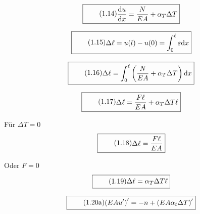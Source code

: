 \documentclass[11pt]{article}
\newcommand{\1}{ {\mathds{1}} }
\begin{document}
\begin{multicols}{2}
		\begin{equation}
			\boxed{
				\tag{1.14}
				\begin{split}
					\frac{\text{d}u}
							 {\text{d}x}
					=
					\frac{N}{EA}
					+
					\alpha_T \Delta T
				\end{split}
			}
		\end{equation}

		\begin{equation}
			\boxed{
				\tag{1.15}
				\begin{split}
					\Delta \ell
					=
					u(l)
					-
					u(0)
					=
					\int_{0}^{\ell}
					\varepsilon
					\text{d}x
				\end{split}
			}
		\end{equation}
		 
		\begin{equation}
			\boxed{
				\tag{1.16}
				\begin{split}
					\Delta \ell
					=
					\int_{0}^{\ell}
					\left(
						\frac{N}{EA}
						+
						\alpha_T \Delta T
					\right)
					\text{d}x
				\end{split}
			}
		\end{equation}

		\begin{equation}
			\boxed{
				\tag{1.17}
				\begin{split}
					\Delta \ell
					=
					\frac{F\ell}{EA}
					+
					\alpha_T \Delta T \ell
				\end{split}
			}
		\end{equation}


		Für $\Delta T = 0$
		\begin{equation}
			\boxed{
				\tag{1.18}
				\begin{split}
					\Delta \ell
					=
					\frac{F\ell}{EA}
				\end{split}
			}
		\end{equation}

		Oder $F = 0$
		\begin{equation}
			\boxed{
				\tag{1.19}
				\begin{split}
					\Delta \ell
					=
					\alpha_T \Delta T \ell
				\end{split}
			}
		\end{equation}
		
		\begin{equation}
			\boxed{
				\tag{1.20a}
				\begin{split}
					\left(
						EA u'
					\right)'
					=
					-n
					+
					\left(
						EA \alpha_t \Delta T
					\right)'
				\end{split}
			}
		\end{equation}


\end{multicols}
\end{document}
